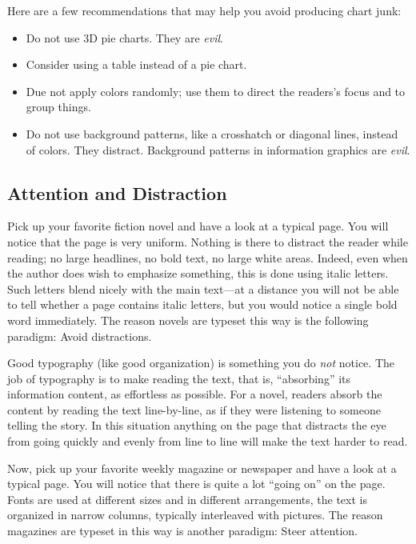 Here are a few recommendations that may help you avoid producing chart junk:
\begin{itemize}
\item
  Do not use 3D pie charts. They are \emph{evil}.
\item
  Consider using a table instead of a pie chart.
\item
  Due not apply colors randomly; use them to direct the readers's 
  focus and to group things.
\item
  Do not use background patterns, like a crosshatch or diagonal
  lines, instead of colors. They distract. Background patterns in
  information graphics are \emph{evil}.
\end{itemize}



\subsection{Attention and Distraction}

Pick up your favorite fiction novel and have a look at a typical
page. You will notice that the page is very uniform. Nothing is there
to distract the reader while reading; no large headlines, no bold
text, no large white areas. Indeed, even when the author does wish to
emphasize something, this is done using italic letters. Such letters
blend nicely with the main text---at a distance you will not be able to
tell whether a page contains italic letters, but you would notice a
single bold word immediately. The reason novels are typeset this way
is the following paradigm: Avoid distractions.

Good typography (like good organization) is something you do
\emph{not} notice. The job of typography is to make reading the text,
that is, ``absorbing'' its information content, as effortless as
possible. For a novel, readers absorb the content by reading the text
line-by-line, as if they were listening to someone telling the
story. In this situation anything on the page that distracts the eye
from  going quickly and evenly from line to line will make the text
harder to read.

Now, pick up your favorite weekly magazine or newspaper and have a
look at a typical 
page. You will notice that there is quite a lot ``going on'' on the
page. Fonts are used at different sizes and in different arrangements,
the text is organized in narrow columns, typically interleaved with
pictures. The reason magazines are typeset in this way is another
paradigm: Steer attention.

